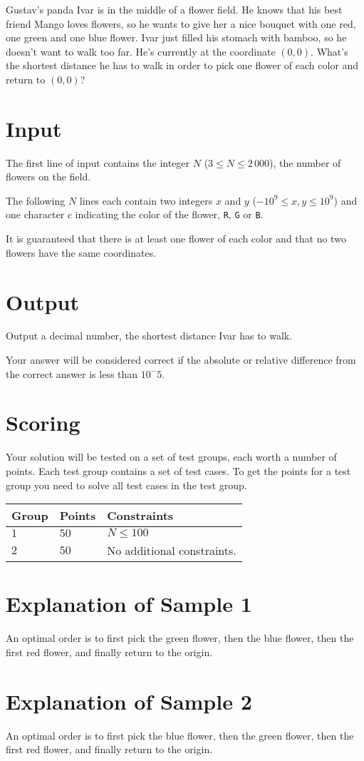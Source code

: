 \noindent

Gustav's panda Ivar is in the middle of a flower field.
He knows that his best friend Mango loves flowers, so he wants to give her a nice bouquet with one red, one green and one blue flower.
Ivar just filled his stomach with bamboo, so he doesn't want to walk too far.
He's currently at the coordinate $(0,0)$. What's the shortest distance he has to walk in order to pick one flower of each color and return to $(0,0)$?

\section*{Input}
The first line of input contains the integer $N$ ($3 \leq N \leq 2\,000$), the number of flowers on the field.

The following $N$ lines each contain two integers $x$ and $y$ ($-10^9 \leq x,y \leq 10^9$) and one character $c$ indicating the color
of the flower, \texttt{R}, \texttt{G} or \texttt{B}.

It is guaranteed that there is at least one flower of each color and that no two flowers have the same coordinates.

\section*{Output}
Output a decimal number, the shortest distance Ivar has to walk.

Your answer will be considered correct if the absolute or relative difference from the correct answer is less than $10^-5$.

\section*{Scoring}
Your solution will be tested on a set of test groups, each worth a number of points. Each test group contains
a set of test cases. To get the points for a test group you need to solve all test cases in the test group.

\noindent
\begin{tabular}{| l | l | p{12cm} |}
  \hline
  \textbf{Group} & \textbf{Points} & \textbf{Constraints} \\ \hline
  $1$    & $50$       & $N \leq 100$ \\ \hline
  $2$    & $50$       & No additional constraints. \\ \hline
\end{tabular}

\section*{Explanation of Sample 1}
An optimal order is to first pick the green flower, then the blue flower, then the first red flower, and finally return to the origin.

\section*{Explanation of Sample 2}
An optimal order is to first pick the blue flower, then the green flower, then the first red flower, and finally return to the origin.
